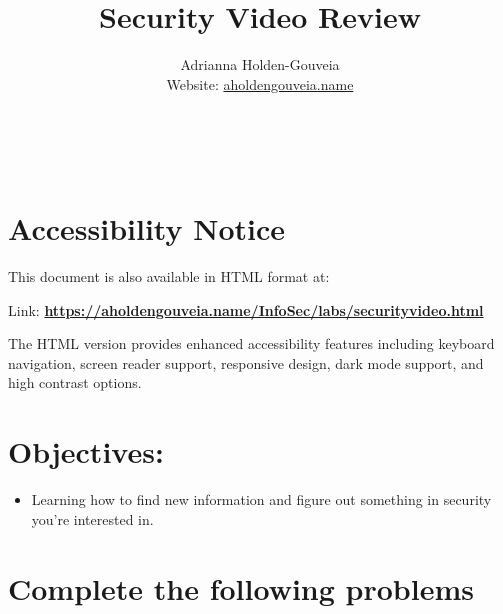 \documentclass[12pt]{article}
\title{Security Video Review}
\author{
        Adrianna Holden-Gouveia \\
        Website: \href{https://aholdengouveia.name}{aholdengouveia.name}\\ 
        \date{\vspace{-5ex}}
        \faGithub {: aholdengouveia} \\
        \faTwitter {: aholdengouveia} \\
        }
\begin{document}
    

\maketitle

\section*{Accessibility Notice}
This document is also available in HTML format at:

Link: \href{https://aholdengouveia.name/InfoSec/labs/securityvideo.html}{\textbf{https://aholdengouveia.name/InfoSec/labs/securityvideo.html}}

The HTML version provides enhanced accessibility features including keyboard navigation, screen reader support, responsive design, dark mode support, and high contrast options.


  
\section*{Objectives:}
\begin{itemize}
    \item Learning how to find new information and figure out something in security you're interested in.
\end{itemize}
\section*{Complete the following problems}

\end{document}
